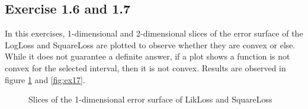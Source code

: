 \documentclass[fleqn]{article}
\begin{document}
\subsection*{Exercise 1.6 and 1.7}
In this exercises, 1-dimensional and 2-dimensional slices of the error surface of the LogLoss and SquareLoss are plotted to observe whether they are convex or else. While it does not guarantee a definite answer, if a plot shows a function is not convex for the selected interval, then it is not convex. Results are observed in figure \ref{fig:ex16} and \ref{fig:ex17}.
\begin{figure}[H]
    \centering
    \qquad
    \caption{Slices of the 1-dimensional error surface of LikLoss and SquareLoss}
    \label{fig:ex16}
\end{figure}
\end{document}

